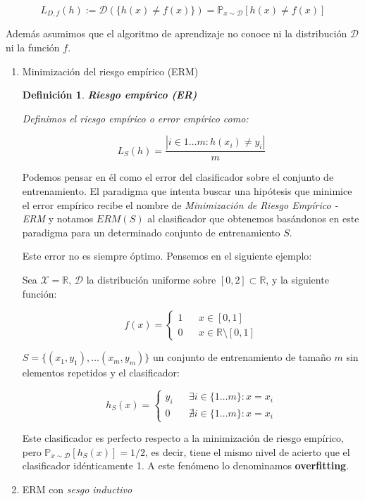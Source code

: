 \documentclass[11pt]{article}
\newtheorem{definition}{Definición}
\begin{document}
\[L_{D,f}(h) := \mathcal{D}(\{h(x)\neq f(x)\}) = \mathbb{P}_{x\sim \mathcal{D}} [h(x)\neq f(x)]\]

Además asumimos que el algoritmo de aprendizaje no conoce ni la distribución $\mathcal{D}$ ni la función $f$.

\begin{enumerate}
\item Minimización del riesgo empírico (ERM)
\label{sec-1-0-0-1}

\begin{definition}
\textbf{Riesgo empírico (ER)}

Definimos el riesgo empírico o error empírico como:

\[L_S(h) = \frac{|i\in {1\ldots m}: h(x_i) \neq y_i|}{m}\]
\end{definition}

Podemos pensar en él como el error del clasificador sobre el conjunto de entrenamiento. El paradigma que intenta buscar una hipótesis que minimice el error empírico recibe el nombre de \emph{Minimización de Riesgo Empírico - ERM} y notamos $ERM(S)$ al clasificador que obtenemos basándonos en este paradigma para un determinado conjunto de entrenamiento $S$.

Este error no es siempre óptimo. Pensemos en el siguiente ejemplo:

Sea $\mathcal{X} = \mathbb{R}$, $\mathcal{D}$ la distribución uniforme sobre $[0,2]\subset \mathbb{R}$, y la siguiente función:

\[f(x) = \left\{\begin{array}{lcl}
1 && x\in [0,1]\\
0 && x\in \mathbb{R}\setminus [0,1]
\end{array}\right.\]


$S = \{(x_1,y_1), \ldots (x_m, y_m)\}$ un conjunto de entrenamiento de tamaño $m$ sin elementos repetidos y el clasificador:

\[h_S(x) = \left\{\begin{array}{lcl}
y_i && \exists i\in \{1\ldots m\} : x=x_i\\
0 && \nexists i\in \{1\ldots m\} : x=x_i
\end{array}\right.\]

Este clasificador es perfecto respecto a la minimización de riesgo empírico, pero $\mathbb{P}_{x\sim \mathcal{D}}[h_S(x)] = 1/2$, es decir, tiene el mismo nivel de acierto que el clasificador idénticamente 1. A este fenómeno lo denominamos \textbf{overfitting}.

\item ERM con \emph{sesgo inductivo}
\label{sec-1-0-0-2}


\end{enumerate}
\end{document}

